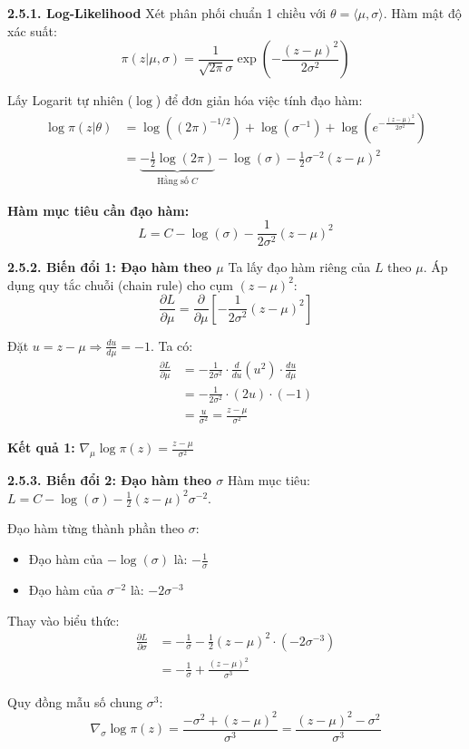 \documentclass[10pt,xcolor=dvipsnames]{beamer}
\begin{document}
\begin{frame}{\textbf{2.5.1. Log-Likelihood}}
	Xét phân phối chuẩn 1 chiều với $\theta = \langle \mu, \sigma \rangle$. Hàm mật độ xác suất:
	\[ \pi(z|\mu, \sigma) = \frac{1}{\sqrt{2\pi}\sigma} \exp\left( - \frac{(z - \mu)^2}{2\sigma^2} \right) \]
	
	Lấy Logarit tự nhiên ($\log$) để đơn giản hóa việc tính đạo hàm:
	\begin{align*}
		\log \pi(z|\theta) &= \log\left( (2\pi)^{-1/2} \right) + \log(\sigma^{-1}) + \log\left( e^{ - \frac{(z - \mu)^2}{2\sigma^2} } \right) \\
		&= \underbrace{-\frac{1}{2}\log(2\pi)}_{\text{Hằng số } C} - \log(\sigma) - \frac{1}{2}\sigma^{-2}(z - \mu)^2
	\end{align*}
	
	\textbf{Hàm mục tiêu cần đạo hàm:}
	\[ L = C - \log(\sigma) - \frac{1}{2\sigma^2}(z - \mu)^2 \]
\end{frame}

\begin{frame}{\textbf{2.5.2. Biến đổi 1: Đạo hàm theo $\mu$}}
	Ta lấy đạo hàm riêng của $L$ theo $\mu$. Áp dụng quy tắc chuỗi (chain rule) cho cụm $(z-\mu)^2$:
	\[ \frac{\partial L}{\partial \mu} = \frac{\partial}{\partial \mu} \left[ - \frac{1}{2\sigma^2}(z - \mu)^2 \right] \]
	
	Đặt $u = z - \mu \Rightarrow \frac{du}{d\mu} = -1$. Ta có:
	\begin{align*}
		\frac{\partial L}{\partial \mu} &= -\frac{1}{2\sigma^2} \cdot \frac{d}{du}(u^2) \cdot \frac{du}{d\mu} \\
		&= -\frac{1}{2\sigma^2} \cdot (2u) \cdot (-1) \\
		&= \frac{u}{\sigma^2} = \frac{z - \mu}{\sigma^2}
	\end{align*}
	
	\textbf{Kết quả 1:} $\nabla_\mu \log \pi(z) = \frac{z - \mu}{\sigma^2}$
\end{frame}

\begin{frame}{\textbf{2.5.3. Biến đổi 2: Đạo hàm theo $\sigma$}}
	Hàm mục tiêu: $L = C - \log(\sigma) - \frac{1}{2}(z - \mu)^2 \sigma^{-2}$.
	
	Đạo hàm từng thành phần theo $\sigma$:
	\begin{itemize}
		\item Đạo hàm của $-\log(\sigma)$ là: $-\frac{1}{\sigma}$
		\item Đạo hàm của $\sigma^{-2}$ là: $-2\sigma^{-3}$
	\end{itemize}
	
	Thay vào biểu thức:
	\begin{align*}
		\frac{\partial L}{\partial \sigma} &= -\frac{1}{\sigma} - \frac{1}{2}(z - \mu)^2 \cdot (-2\sigma^{-3}) \\
		&= -\frac{1}{\sigma} + \frac{(z - \mu)^2}{\sigma^3}
	\end{align*}
	
	Quy đồng mẫu số chung $\sigma^3$:
	\[ \nabla_\sigma \log \pi(z) = \frac{-\sigma^2 + (z - \mu)^2}{\sigma^3} = \frac{(z - \mu)^2 - \sigma^2}{\sigma^3} \]
\end{frame}
\end{document}
